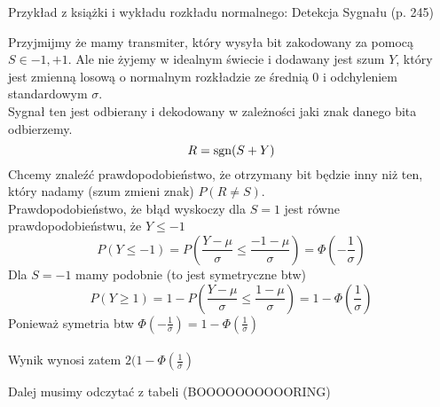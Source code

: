 Przykład z książki i wykładu rozkładu normalnego: Detekcja Sygnału (p. 245)

\begin{exercise}
\end{exercise}
    Przyjmijmy że mamy transmiter, który wysyła bit zakodowany za pomocą   
    \( S \in {-1, +1}\). Ale nie żyjemy w idealnym świecie i dodawany jest szum \( Y\), który jest zmienną losową o normalnym rozkładzie ze średnią 0 i odchyleniem standardowym \( \sigma \). \\
    Sygnał ten jest odbierany i dekodowany w zależności jaki znak danego bita odbierzemy. \[ R = \operatorname{sgn}(S + Y)\]
    Chcemy znaleźć prawdopodobieństwo, że otrzymany bit będzie inny niż ten, który nadamy (szum zmieni znak) \(P(R \neq S)\).\\
    
Prawdopodobieństwo, że błąd wyskoczy dla \( S = 1\) jest równe prawdopodobieństwu, że \( Y \leq -1 \)
\[
    P(Y \leq -1) = P \left( \frac{Y - \mu}{\sigma} \leq \frac{-1 - \mu}{\sigma} \right) = \Phi\left(-\frac{1}{\sigma}\right)
\]
Dla \( S = -1 \) mamy podobnie (to jest symetryczne btw)
\[
    P(Y \geq 1) = 1 - P \left( \frac{Y - \mu}{\sigma} \leq \frac{1 - \mu}{\sigma} \right) = 1 - \Phi\left(\frac{1}{\sigma}\right)
\]
Ponieważ symetria btw \( \Phi(-\frac{1}{\sigma}) = 1 - \Phi(\frac{1}{\sigma})\) \\ \\
Wynik wynosi zatem \( 2(1 - \Phi(\frac{1}{\sigma})\)

Dalej musimy odczytać z tabeli (BOOOOOOOOOORING)
